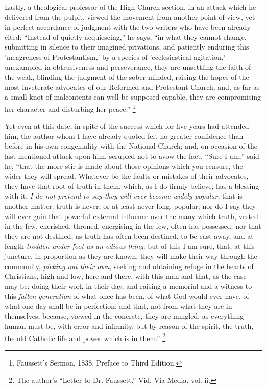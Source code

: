 Lastly, a theological professor of the High Church section, in an
attack which he delivered from the pulpit, viewed the movement from
another point of view, yet in perfect accordance of judgment with the
two writers who have been already cited: ``Instead of quietly
acquiescing,'' he says, ``in what they cannot change,
submitting in silence to their imagined privations, and patiently
enduring this 'meagreness of Protestantism,' by a species of
'ecclesiastical agitation,' unexampled in obtrusiveness and
perseverance, they are unsettling the faith of the weak, blinding the
judgment of the sober-minded, raising the hopes of the most inveterate
advocates of our Reformed and Protestant Church, and, as far as a
small knot of malcontents can well be supposed capable, they are
compromising her character and disturbing her peace.'' \footnote{Faussett's Sermon, 1838, Preface to Third
Edition.}

Yet even at this date, in spite of the success which for five years
had attended him, the author whom I have already quoted felt no
greater confidence than before in his own congeniality with the
National Church; and, on occasion of the last-mentioned attack upon
him, scrupled not to avow the fact. ``Sure I am,'' said he,
``that the more stir is made about those opinions which you
censure, the wider they will spread. Whatever be the faults or
mistakes of their advocates, they have that root of truth in them,
which, as I do firmly believe, has a blessing with it. \emph{I do not
pretend to say they will ever become widely popular}, that is
another matter: truth is never, or at least never long, popular; nor
do I say they will ever gain that powerful external influence over the
many which truth, vested in the few, cherished, throned, energising in
the few, often has possessed; nor that they are not destined, as truth
has often been destined, to be cast away, and at length \emph{trodden
under foot as an odious thing}: but of this I am sure, that, at
this juncture, in proportion as they are known, they will make their
way through the community, \emph{picking out their own}, seeking and
obtaining refuge in the hearts of Christians, high and low, here and
there, with this man and that, as the case may be; doing their work in
their day, and raising a memorial and a witness to this \emph{fallen
generation} of what once has been, of what God would ever have, of
what one day shall be in perfection; and that, not from what they are
in themselves, because, viewed in the concrete, they are mingled, as
everything human must be, with error and infirmity, but by reason of
the spirit, the truth, the old Catholic life and power which is in
them.'' \footnote{The author's ``Letter to Dr. Faussett.''
Vid. Via Media. vol. ii.}

